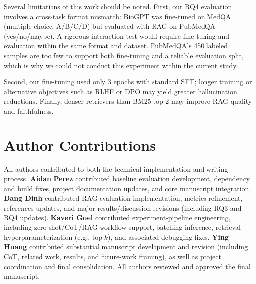 \documentclass[11pt]{article}
\begin{document}
Several limitations of this work should be noted. First, our RQ4 
evaluation involves a cross-task format mismatch: BioGPT was fine-tuned 
on MedQA (multiple-choice, A/B/C/D) but evaluated with RAG on PubMedQA 
(yes/no/maybe). A rigorous interaction test would require fine-tuning 
and evaluation within the same format and dataset. PubMedQA's 450 
labeled samples are too few to support both fine-tuning and a reliable 
evaluation split, which is why we could not conduct this experiment 
within the current study.
 
Second, our fine-tuning used only 3 epochs with standard SFT; longer 
training or alternative objectives such as RLHF or DPO may yield 
greater hallucination reductions. Finally, denser retrievers than BM25 
top-2 may improve RAG quality and faithfulness.

\section{Author Contributions}

All authors contributed to both the technical implementation and writing process.
\textbf{Aidan Perez} contributed baseline evaluation development,
dependency and build fixes, project documentation updates, and core
manuscript integration. \textbf{Dang Dinh} contributed RAG evaluation
implementation, metrics refinement, references updates, and major
results/discussion revisions (including RQ3 and RQ4 updates).
\textbf{Kaveri Goel} contributed experiment-pipeline engineering,
including zero-shot/CoT/RAG workflow support, batching inference,
retrieval hyperparameterization (e.g., top-$k$), and associated
debugging fixes. \textbf{Ying Huang} contributed substantial manuscript
development and revision (including CoT, related work, results, and
future-work framing), as well as project coordination and final
consolidation. All authors reviewed and approved the final manuscript.


\end{document}

